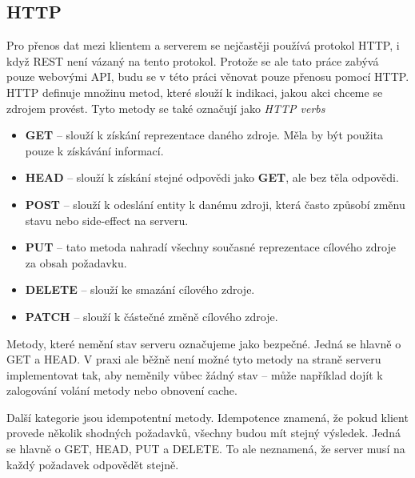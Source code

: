 \documentclass[thesis=M,czech]{FITthesis}[2019/12/23]
\begin{document}
\subsection{HTTP}
Pro přenos dat mezi klientem a serverem se nejčastěji používá protokol HTTP, i když REST není vázaný na tento protokol. Protože se ale tato práce zabývá pouze webovými API, budu se v této práci věnovat pouze přenosu pomocí HTTP.
HTTP definuje množinu metod, které slouží k indikaci, jakou akci chceme se zdrojem provést. Tyto metody se také označují jako \textit{HTTP verbs} \cite{http_metods}

\begin{itemize}
    \item \textbf{GET} -- slouží k získání reprezentace daného zdroje. Měla by být použita pouze k získávání informací.
    \item \textbf{HEAD} -- slouží k získání stejné odpovědi jako \textbf{GET}, ale bez těla odpovědi.
    \item \textbf{POST} -- slouží k odeslání entity k danému zdroji, která často způsobí změnu stavu nebo side-effect na serveru.
    \item \textbf{PUT} -- tato metoda nahradí všechny současné reprezentace cílového zdroje za obsah požadavku.
    \item \textbf{DELETE} -- slouží ke smazání cílového zdroje.
    \item \textbf{PATCH} -- slouží k částečné změně cílového zdroje.
\end{itemize}

Metody, které nemění stav serveru označujeme jako bezpečné. Jedná se hlavně o GET a HEAD. V praxi ale běžně není možné tyto metody na straně serveru implementovat tak, aby neměnily vůbec žádný stav -- může například dojít k zalogování volání metody nebo obnovení cache.

Další kategorie jsou idempotentní metody. Idempotence znamená, že pokud klient provede několik shodných požadavků, všechny budou mít stejný výsledek. Jedná se hlavně o GET, HEAD, PUT a DELETE. To ale neznamená, že server musí na každý požadavek odpovědět stejně.
\end{document}
